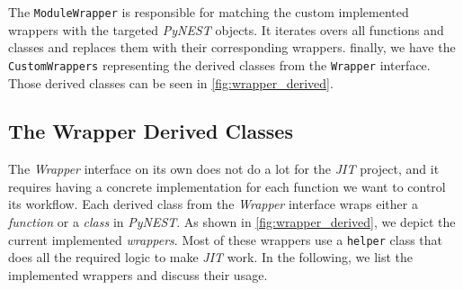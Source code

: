 The \texttt{ModuleWrapper} is responsible for matching the custom implemented wrappers with the targeted \emph{PyNEST} objects. It iterates overs all functions and classes and replaces them with their corresponding wrappers. finally, we have the \texttt{CustomWrappers} representing the derived classes from the \texttt{Wrapper} interface. Those derived classes can be seen in \autoref{fig:wrapper_derived}.

\subsection{The Wrapper Derived Classes}

The \emph{Wrapper} interface on its own does not do a lot for the \emph{JIT} project, and it requires having a concrete implementation for each function we want to control its workflow. Each derived class from the \emph{Wrapper} interface wraps either a \emph{function} or a \emph{class} in \emph{PyNEST}. As shown in \autoref{fig:wrapper_derived}, we depict the current implemented \emph{wrappers}. Most of these wrappers use a \texttt{helper} class that does all the required logic to make \emph{JIT} work. In the following, we list the implemented wrappers and discuss their usage.

